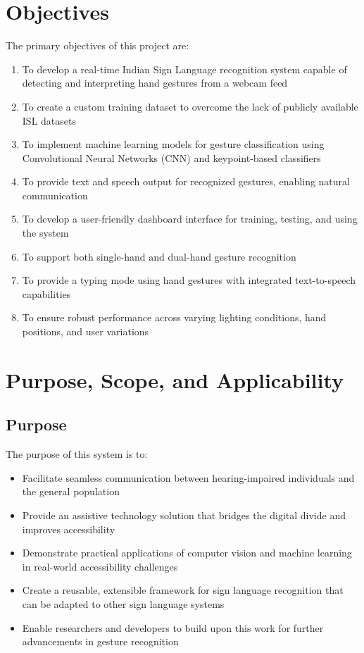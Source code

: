 \documentclass[12pt,a4paper]{report}
\begin{document}
\section{Objectives}

The primary objectives of this project are:

\begin{enumerate}
    \item To develop a real-time Indian Sign Language recognition system capable of detecting and interpreting hand gestures from a webcam feed
    \item To create a custom training dataset to overcome the lack of publicly available ISL datasets
    \item To implement machine learning models for gesture classification using Convolutional Neural Networks (CNN) and keypoint-based classifiers
    \item To provide text and speech output for recognized gestures, enabling natural communication
    \item To develop a user-friendly dashboard interface for training, testing, and using the system
    \item To support both single-hand and dual-hand gesture recognition
    \item To provide a typing mode using hand gestures with integrated text-to-speech capabilities
    \item To ensure robust performance across varying lighting conditions, hand positions, and user variations
\end{enumerate}

\section{Purpose, Scope, and Applicability}

\subsection{Purpose}

The purpose of this system is to:
\begin{itemize}
    \item Facilitate seamless communication between hearing-impaired individuals and the general population
    \item Provide an assistive technology solution that bridges the digital divide and improves accessibility
    \item Demonstrate practical applications of computer vision and machine learning in real-world accessibility challenges
    \item Create a reusable, extensible framework for sign language recognition that can be adapted to other sign language systems
    \item Enable researchers and developers to build upon this work for further advancements in gesture recognition
\end{itemize}
\end{document}
